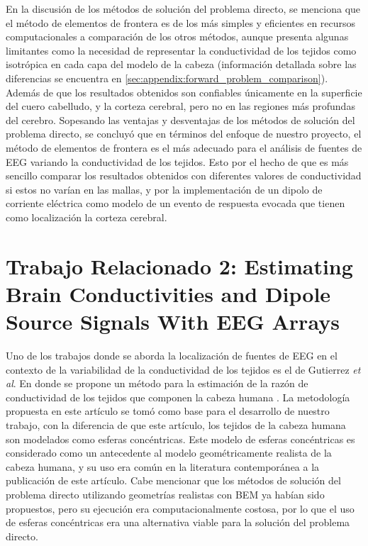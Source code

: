 En la discusión de los métodos de solución del problema directo, se menciona que el método de elementos de frontera es de los más simples y eficientes en recursos computacionales a comparación de los otros métodos, aunque presenta algunas limitantes como la necesidad de representar la conductividad de los tejidos como isotrópica en cada capa del modelo de la cabeza (información detallada sobre las diferencias se encuentra en \cref{sec:appendix:forward_problem_comparison}). Además de que los resultados obtenidos son confiables únicamente en la superficie del cuero cabelludo, y la corteza cerebral, pero no en las regiones más profundas del cerebro. Sopesando las ventajas y desventajas de los métodos de solución del problema directo, se concluyó que en términos del enfoque de nuestro proyecto, el método de elementos de frontera es el más adecuado para el análisis de fuentes de EEG variando la conductividad de los tejidos. Esto por el hecho de que es más sencillo  comparar los resultados obtenidos con diferentes valores de conductividad si estos no varían en las mallas, y por la implementación de un dipolo de corriente eléctrica como modelo de un evento de respuesta evocada que tienen como localización la corteza cerebral.

\section{Trabajo Relacionado 2: Estimating Brain Conductivities and Dipole Source Signals With EEG Arrays}
\label{sec:related:gutierrez}

Uno de los trabajos donde se aborda la localización de fuentes de EEG en el contexto de la variabilidad de la conductividad de los tejidos es el de Gutierrez \emph{et al}. En donde se propone un método para la estimación de la razón de conductividad de los tejidos que componen la cabeza humana \cite{Gutierrez2004}. La metodología propuesta en este artículo se tomó como base para el desarrollo de nuestro trabajo, con la diferencia de que este artículo, los tejidos de la cabeza humana son modelados como esferas concéntricas. Este modelo de esferas concéntricas es considerado como un antecedente al modelo geométricamente realista de la cabeza humana, y su uso era común en la literatura contemporánea a la publicación de este artículo. Cabe mencionar que los métodos de solución del problema directo utilizando geometrías realistas con BEM ya habían sido propuestos, pero su ejecución era computacionalmente costosa, por lo que el uso de esferas concéntricas era una alternativa viable para la solución del problema directo.

